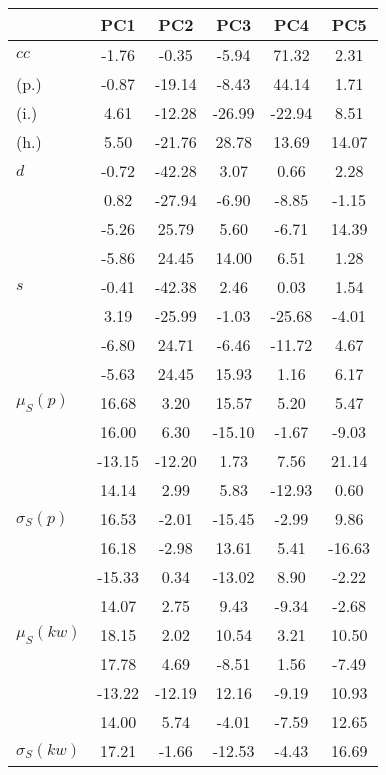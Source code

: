 \begin{table}[h!]
\begin{center}
\begin{tabular}{| l | c | c | c | c | c |}\hline
 & PC1 & PC2 & PC3 & PC4 & PC5 \\\hline
$cc$ & -1.76  & -0.35  & -5.94  & 71.32  & 2.31 \\\hline
(p.) & -0.87  & -19.14  & -8.43  & 44.14  & 1.71 \\\hline
(i.) & 4.61  & -12.28  & -26.99  & -22.94  & 8.51 \\\hline
(h.) & 5.50  & -21.76  & 28.78  & 13.69  & 14.07 \\\hline
$d$ & -0.72  & -42.28  & 3.07  & 0.66  & 2.28 \\\hline
 & 0.82  & -27.94  & -6.90  & -8.85  & -1.15 \\\hline
 & -5.26  & 25.79  & 5.60  & -6.71  & 14.39 \\\hline
 & -5.86  & 24.45  & 14.00  & 6.51  & 1.28 \\\hline
$s$ & -0.41  & -42.38  & 2.46  & 0.03  & 1.54 \\\hline
 & 3.19  & -25.99  & -1.03  & -25.68  & -4.01 \\\hline
 & -6.80  & 24.71  & -6.46  & -11.72  & 4.67 \\\hline
 & -5.63  & 24.45  & 15.93  & 1.16  & 6.17 \\\hline
$\mu_S(p)$ & 16.68  & 3.20  & 15.57  & 5.20  & 5.47 \\\hline
 & 16.00  & 6.30  & -15.10  & -1.67  & -9.03 \\\hline
 & -13.15  & -12.20  & 1.73  & 7.56  & 21.14 \\\hline
 & 14.14  & 2.99  & 5.83  & -12.93  & 0.60 \\\hline
$\sigma_S(p)$ & 16.53  & -2.01  & -15.45  & -2.99  & 9.86 \\\hline
 & 16.18  & -2.98  & 13.61  & 5.41  & -16.63 \\\hline
 & -15.33  & 0.34  & -13.02  & 8.90  & -2.22 \\\hline
 & 14.07  & 2.75  & 9.43  & -9.34  & -2.68 \\\hline
$\mu_S(kw)$ & 18.15  & 2.02  & 10.54  & 3.21  & 10.50 \\\hline
 & 17.78  & 4.69  & -8.51  & 1.56  & -7.49 \\\hline
 & -13.22  & -12.19  & 12.16  & -9.19  & 10.93 \\\hline
 & 14.00  & 5.74  & -4.01  & -7.59  & 12.65 \\\hline
$\sigma_S(kw)$ & 17.21  & -1.66  & -12.53  & -4.43  & 16.69 \\\hline

\end{tabular}
\end{center}
\end{table}
